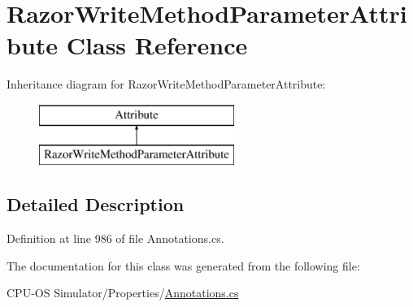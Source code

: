 \hypertarget{class_razor_write_method_parameter_attribute}{}\section{Razor\+Write\+Method\+Parameter\+Attribute Class Reference}
\label{class_razor_write_method_parameter_attribute}
Inheritance diagram for Razor\+Write\+Method\+Parameter\+Attribute\+:\begin{figure}[H]
\begin{center}
\leavevmode
\includegraphics[height=2.000000cm]{class_razor_write_method_parameter_attribute}
\end{center}
\end{figure}


\subsection{Detailed Description}


Definition at line 986 of file Annotations.\+cs.



The documentation for this class was generated from the following file\+:\begin{DoxyCompactItemize}
\item 
C\+P\+U-\/\+O\+S Simulator/\+Properties/\hyperlink{_annotations_8cs}{Annotations.\+cs}\end{DoxyCompactItemize}
